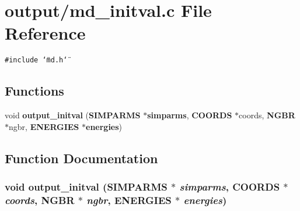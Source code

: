 \section{output/md\_\-initval.c File Reference}
\label{md__initval_8c}
{\tt \#include \char`\"{}md.h\char`\"{}}\par
\subsection*{Functions}
\begin{CompactItemize}
\item 
void {\bf output\_\-initval} ({\bf SIMPARMS} $\ast${\bf simparms}, {\bf COORDS} $\ast$coords, {\bf NGBR} $\ast$ngbr, {\bf ENERGIES} $\ast${\bf energies})
\end{CompactItemize}


\subsection{Function Documentation}
\subsubsection{\setlength{\rightskip}{0pt plus 5cm}void output\_\-initval ({\bf SIMPARMS} $\ast$ {\em simparms}, {\bf COORDS} $\ast$ {\em coords}, {\bf NGBR} $\ast$ {\em ngbr}, {\bf ENERGIES} $\ast$ {\em energies})}\label{md__initval_8c_52db95ba0c90f6c4c10c19e07b30b1aa}


